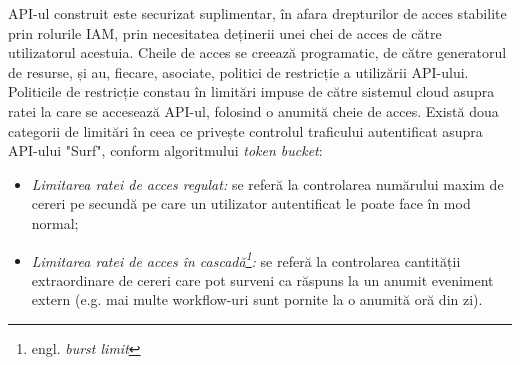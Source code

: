 \noindent
API-ul construit este securizat suplimentar, în afara drepturilor de acces stabilite prin rolurile IAM, prin necesitatea deținerii unei chei de acces de către utilizatorul acestuia. Cheile de acces se creează programatic, de către generatorul de resurse, și au, fiecare, asociate, politici de restricție a utilizării API-ului. Politicile de restricție constau în limitări impuse de către sistemul cloud asupra ratei la care se accesează API-ul, folosind o anumită cheie de acces. Există doua categorii de limitări în ceea ce privește controlul traficului autentificat asupra API-ului "Surf", conform algoritmului \textit{token bucket}:

\begin{itemize}
	\item{\textit{Limitarea ratei de acces regulat:} se referă la controlarea numărului maxim de cereri pe secundă pe care un utilizator autentificat le poate face în mod normal;}
	
	\item{\textit{Limitarea ratei de acces în cascadă\footnote{engl. \textit{burst limit}}:} se referă la controlarea cantității extraordinare de cereri care pot surveni ca răspuns la un anumit eveniment extern (e.g. mai multe workflow-uri sunt pornite la o anumită oră din zi).}
	
\end{itemize}